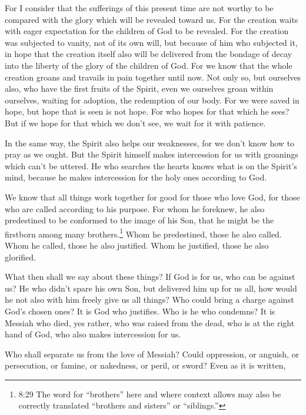 \myverse{}For I consider that the sufferings of this present time are not
worthy to be compared with the glory which will be revealed toward us.
\myverse{}For the creation waits with eager expectation for the children of God to be
revealed.
\myverse{}For the creation was subjected to vanity, not of its own will, but because
of him who subjected it, in hope
\myverse{}that the creation itself also will be delivered from the bondage of decay
into the liberty of the glory of the children of God.
\myverse{}For we know that the whole creation groans and travails in pain together until
now.
\myverse{}Not only so, but ourselves also, who have the first fruits of the Spirit,
even we ourselves groan within ourselves, waiting for adoption, the redemption of our body.
\myverse{}For we were saved in hope, but hope that is seen is not hope. For who hopes
for that which he sees?
\myverse{}But if we hope for that which we don’t see, we wait for it with patience.

\myverse{}In the same way, the Spirit also helps our weaknesses, for we
don’t know how to pray as we ought. But the Spirit himself makes intercession for us with groanings which
can’t be uttered.
\myverse{}He who searches the hearts knows what is on the Spirit’s mind, because he
makes intercession for the holy ones according to God.

\myverse{}We know that all things work together for good for those who
love God, for those who are called according to his purpose.
\myverse{}For whom he foreknew, he also predestined to be conformed to the image of
his Son, that he might be the firstborn among many brothers.\footnote{8:29 The word for “brothers” here and where context allows may also be correctly translated “brothers
	and sisters” or “siblings.”}
\myverse{}Whom he predestined, those he also called. Whom he called, those he also justified.
Whom he justified, those he also glorified.

\myverse{}What then shall we say about these things? If God is for us,
who can be against us?
\myverse{}He who didn’t spare his own Son, but delivered him up for us all, how would
he not also with him freely give us all things?
\myverse{}Who could bring a charge against God’s chosen ones? It is God who justifies.
\myverse{}Who is he who condemns? It is Messiah who died, yes rather, who was raised
from the dead, who is at the right hand of God, who also makes intercession for us.

\myverse{}Who shall separate us from the love of Messiah? Could oppression,
or anguish, or persecution, or famine, or nakedness, or peril, or sword?
\myverse{}Even as it is written,

